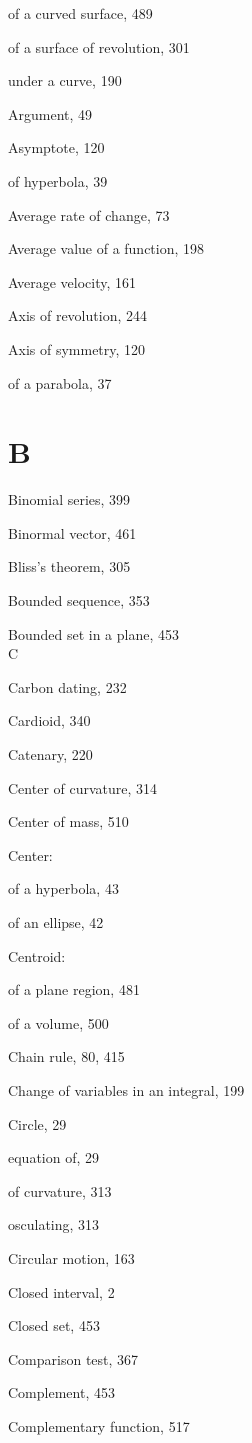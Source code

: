 \documentclass[10pt]{article}
\begin{document}
of a curved surface, 489

of a surface of revolution, 301

under a curve, 190

Argument, 49

Asymptote, 120

of hyperbola, 39

Average rate of change, 73

Average value of a function, 198

Average velocity, 161

Axis of revolution, 244

Axis of symmetry, 120

of a parabola, 37

\section*{B}
Binomial series, 399

Binormal vector, 461

Bliss's theorem, 305

Bounded sequence, 353

Bounded set in a plane, 453\\
C

Carbon dating, 232

Cardioid, 340

Catenary, 220

Center of curvature, 314

Center of mass, 510

Center:

of a hyperbola, 43

of an ellipse, 42

Centroid:

of a plane region, 481

of a volume, 500

Chain rule, 80, 415

Change of variables in an integral, 199

Circle, 29

equation of, 29

of curvature, 313

osculating, 313

Circular motion, 163

Closed interval, 2

Closed set, 453

Comparison test, 367

Complement, 453

Complementary function, 517
\end{document}

